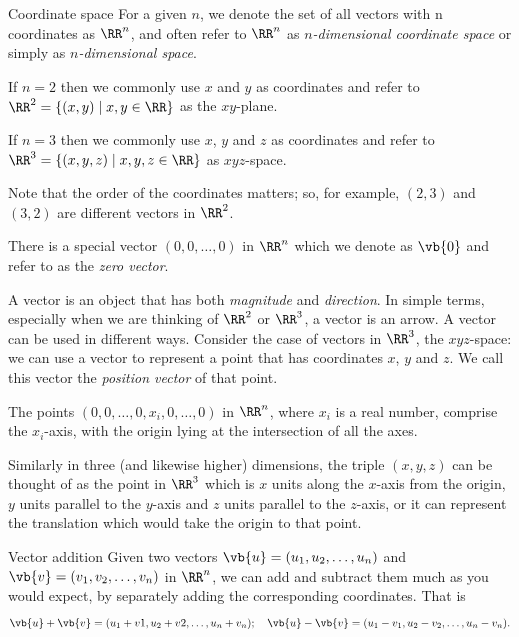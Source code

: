 \begin{defn}{Coordinate space}{}
For a given $n$, we denote the set of all vectors with n coordinates as $\RR^n$, and often refer to $\RR^n$ as \emph{$n$-dimensional coordinate space} or simply as \emph{$n$-dimensional space}.
\end{defn}

If $n=2$ then we commonly use $x$ and $y$ as coordinates and refer to $\RR^2=\{(x,y)\mid x,y\in\RR\}$ as the $xy$-plane.

If $n=3$ then we commonly use $x$, $y$ and $z$ as coordinates and refer to $\RR^3=\{(x,y,z)\mid x,y,z\in\RR\}$ as $xyz$-space. 

\begin{remark}
Note that the order of the coordinates matters; so, for example, $(2,3)$ and $(3,2)$ are different vectors in $\RR^2$.
\end{remark}

There is a special vector $(0,0,\dots,0)$ in $\RR^n$ which we denote as $\vb{0}$ and refer to as the \emph{zero vector}.

A vector is an object that has both \emph{magnitude} and \emph{direction}. In simple terms, especially when we are thinking of $\RR^2$ or $\RR^3$, a vector is an arrow. A vector can be used in different ways. Consider the case of vectors in $\RR^3$, the $xyz$-space: we can use a vector to represent a point that has coordinates $x$, $y$ and $z$. We call this vector the \emph{position vector} of that point.

The points $(0,0,\dots,0,x_i,0,\dots,0)$ in $\RR^n$, where $x_i$ is a real number, comprise the $x_i$-axis, with the origin lying at the intersection of all the axes.

Similarly in three (and likewise higher) dimensions, the triple $(x,y,z)$ can be thought of as the point in $\RR^3$ which is $x$ units along the $x$-axis from the origin, $y$ units parallel to the $y$-axis and $z$ units parallel to the $z$-axis, or it can represent the translation which would take the origin to that point.

\begin{defn}{Vector addition}{}
Given two vectors $\vb{u}=(u_1,u_2,\dots,u_n)$ and $\vb{v}=(v_1,v_2,\dots,v_n)$ in $\RR^n$, we can add and subtract them much as you would expect, by separately adding the corresponding coordinates.
That is
\[ \vb{u}+\vb{v}=(u_1+v1, u_2+v2, \dots, u_n+v_n); \quad \vb{u}-\vb{v}=(u_1-v_1, u_2-v_2, \dots, u_n-v_n). \]
\end{defn}

